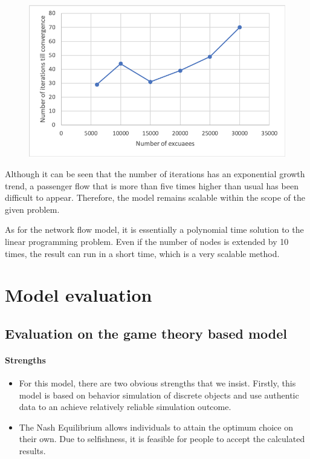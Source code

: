 \documentclass{mcmthesis}
\begin{document}
	\begin{figure}
		\centering
		\includegraphics[width=0.7\linewidth]{../../Figure/screenshot008}
		\caption{}
		\label{fig:screenshot008}
	\end{figure}
	Although it can be seen that the number of iterations has an exponential growth trend, a passenger flow that is more than five times higher than  usual has been difficult to appear. Therefore, the model remains scalable within the scope of the given problem.
	
	As for the network flow model, it is essentially a polynomial time solution to the linear programming problem. Even if the number of nodes is extended by 10 times, the result can  run in a short time, which is a very scalable method.
	\section{Model evaluation}
	\subsection{Evaluation on the game theory based model}
	\paragraph{Strengths}
	
	\begin{itemize}
		\item  For this model, there are two obvious strengths that we insist. Firstly, this model is based on  behavior simulation of discrete objects and use authentic data to an achieve relatively reliable simulation outcome. 
		\item The Nash Equilibrium allows individuals to attain the optimum choice on their own. Due to selfishness, it is feasible for people to accept the calculated results.
	\end{itemize}
	
\end{document}
